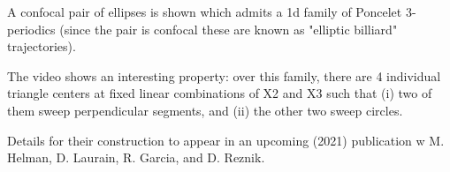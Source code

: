 A confocal pair of ellipses is shown which admits a 1d family of Poncelet 3-periodics (since the pair is confocal these are known as "elliptic billiard" trajectories).

The video shows an interesting property: over this family, there are 4 individual triangle centers at fixed linear combinations of X2 and X3 such that (i) two of them sweep perpendicular segments, and (ii) the other two sweep circles.

Details for their construction to appear in an upcoming (2021) publication w M. Helman, D. Laurain, R. Garcia, and D. Reznik.